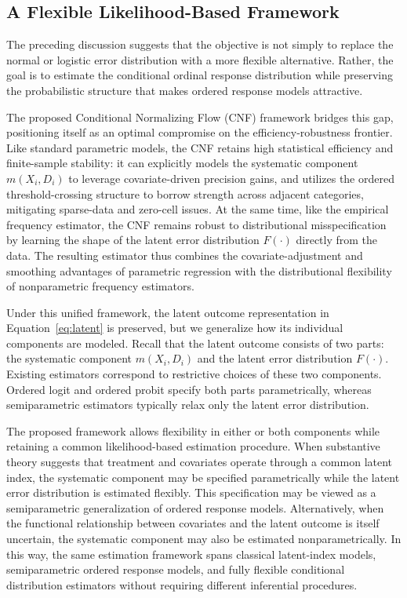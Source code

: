 \documentclass{article}
\begin{document}
\subsection{A Flexible Likelihood-Based Framework}
\label{subsec:framework}

The preceding discussion suggests that the objective is not simply to replace the normal or logistic error distribution with a more flexible alternative. Rather, the goal is to estimate the conditional ordinal response distribution while preserving the probabilistic structure that makes ordered response models attractive. 

The proposed Conditional Normalizing Flow (CNF) framework bridges this gap, positioning itself as an optimal compromise on the efficiency-robustness frontier. Like standard parametric models, the CNF retains high statistical efficiency and finite-sample stability: it can explicitly models the systematic component $m(X_i, D_i)$ to leverage covariate-driven precision gains, and utilizes the ordered threshold-crossing structure to borrow strength across adjacent categories, mitigating sparse-data and zero-cell issues. At the same time, like the empirical frequency estimator, the CNF remains robust to distributional misspecification by learning the shape of the latent error distribution $F(\cdot)$ directly from the data. The resulting estimator thus combines the covariate-adjustment and smoothing advantages of parametric regression with the distributional flexibility of nonparametric frequency estimators.

Under this unified framework, the latent outcome representation in Equation~\eqref{eq:latent} is preserved, but we generalize how its individual components are modeled. Recall that the latent outcome consists of two parts: the systematic component $m(X_i, D_i)$ and the latent error distribution $F(\cdot)$. Existing estimators correspond to restrictive choices of these two components. Ordered logit and ordered probit specify both parts parametrically, whereas semiparametric estimators typically relax only the latent error distribution.

The proposed framework allows flexibility in either or both components while retaining a common likelihood-based estimation procedure. When substantive theory suggests that treatment and covariates operate through a common latent index, the systematic component may be specified parametrically while the latent error distribution is estimated flexibly. This specification may be viewed as a semiparametric generalization of ordered response models. Alternatively, when the functional relationship between covariates and the latent outcome is itself uncertain, the systematic component may also be estimated nonparametrically. In this way, the same estimation framework spans classical latent-index models, semiparametric ordered response models, and fully flexible conditional distribution estimators without requiring different inferential procedures.
\end{document}
